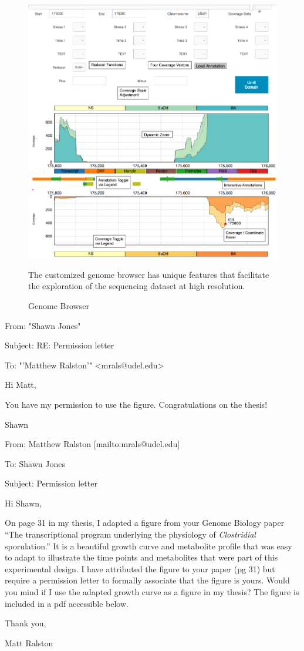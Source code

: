\begin{figure}
\includegraphics[width=\textwidth]{images/Assembly/Browser/Genome_browser_ui.png}
\caption{Genome Browser}\label{app:browser_ui}
The customized genome browser has unique features that facilitate the exploration of the sequencing dataset at high resolution.
\end{figure}


\noindent
From: "Shawn Jones"

\noindent
Subject: RE: Permission letter

\noindent
To: "'Matthew Ralston'" <mrals@udel.edu>

\noindent
Hi Matt,

\noindent
You have my permission to use the figure.
Congratulations on the thesis!

\noindent
Shawn

\noindent
From: Matthew Ralston [mailto:mrals@udel.edu]

\noindent
To: Shawn Jones

\noindent
Subject: Permission letter

\noindent
Hi Shawn,

\noindent
On page 31 in my thesis, I adapted a figure from your Genome Biology paper ``The transcriptional program underlying the physiology of \textit{Clostridial} sporulation.'' It is a beautiful growth curve and metabolite profile that was easy to adapt to illustrate the time points and metabolites that were part of this experimental design. I have attributed the figure to your paper (pg 31) but require a permission letter to formally associate that the figure is yours. Would you mind if I use the adapted growth curve as a figure in my thesis? The figure is included in a pdf accessible below.

\noindent
Thank you,

\noindent
Matt Ralston
